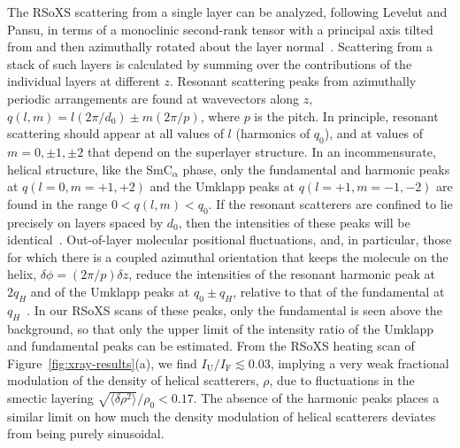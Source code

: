 \documentclass[aagreenthesis]{subfiles}
\begin{document}
The RSoXS scattering from a single layer can be analyzed, following Levelut and
Pansu, in terms of a monoclinic second-rank tensor with a principal
axis tilted from and then azimuthally rotated about the layer normal~\cite{levelut1999tensorial,gleeson_resonant_2006,Barois2012review}.   Scattering
from a stack of such layers is calculated by summing over the contributions of the individual layers at different $z$.
Resonant scattering peaks from azimuthally
periodic arrangements are found at wavevectors along $z$, $q(l,m) = l(2\pi/d_0)
\pm m(2\pi/p)$, where $p$ is the pitch.  In principle, resonant
scattering should appear at all values of $l$ (harmonics of $q_0$), and at values
of $m=0,\pm1,\pm2$ that depend on the superlayer structure.  In an incommensurate, helical
structure, like the SmC$_\alpha$ phase, only the fundamental and harmonic peaks at
$q(l=0,m=+1,+2)$ and the Umklapp peaks at
$q(l=+1,m=-1,-2)$ are found in the range $0 < q(l,m) <
q_0$. If the resonant scatterers are confined to lie precisely on layers spaced
by $d_0$, then the intensities of these peaks will be identical~\cite{levelut1999tensorial}.
Out-of-layer molecular positional fluctuations, and, in particular,
those for which there is a coupled azimuthal orientation that keeps the molecule
on the helix, $\delta \phi = (2\pi/p)\delta z$, reduce the intensities of the
resonant harmonic peak
at $2q_H$ and of the Umklapp peaks at $q_0 \pm q_H$, relative to that of the fundamental at
$q_H$~\cite{levelut1999tensorial}. In our RSoXS scans of these peaks, only the
fundamental is seen above the background, so that only the upper limit of
the intensity ratio of the Umklapp and fundamental peaks
can be estimated. From the RSoXS heating scan of
Figure~\ref{fig:xray-results}(a), we find $I_\text{U}/I_\text{F} \lesssim 0.03$, implying a very
weak fractional modulation of the density of helical scatterers, $\rho$, due to fluctuations in the
smectic layering $\sqrt{\langle\delta\rho^2\rangle}/\rho_0 < 0.17$. The absence of the harmonic peaks places a similar limit on how much the density modulation of helical scatterers deviates from being purely sinusoidal.
\end{document}
